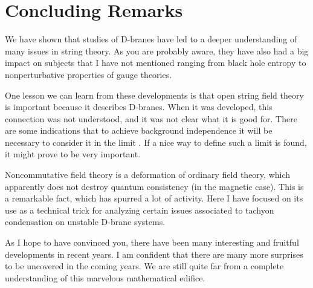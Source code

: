 \documentclass[a4paper,12pt]{article}
\begin{document}
\section{Concluding Remarks}

We have shown that studies of D-branes have led to a deeper
understanding of many issues in string theory.  As you are
probably aware, they have also had a big impact on subjects that I
have not mentioned ranging from black hole entropy to
nonperturbative properties of gauge theories.

One lesson we can learn from these developments is that open
string field theory is important because it describes D-branes.
When it was developed, this connection was not understood, and it
was not clear what it is good for. There are some indications that
to achieve background independence it will be necessary to
consider it in the \coordHE{} limit \cite{W5}. If a nice way to define
such a limit is found, it might prove to be very important.

Noncommutative field theory is a deformation of ordinary field
theory, which apparently does not destroy quantum consistency (in
the magnetic case). This is a remarkable fact, which has spurred a
lot of activity. Here I have focused on its use as a technical
trick for analyzing certain issues associated to tachyon
condensation on unstable D-brane systems.

As I hope to have convinced you, there have been many interesting
and fruitful developments in recent years. I am confident that
there are many more surprises to be uncovered in the coming years.
We are still quite far from a complete understanding of this
marvelous mathematical edifice.
\end{document}
